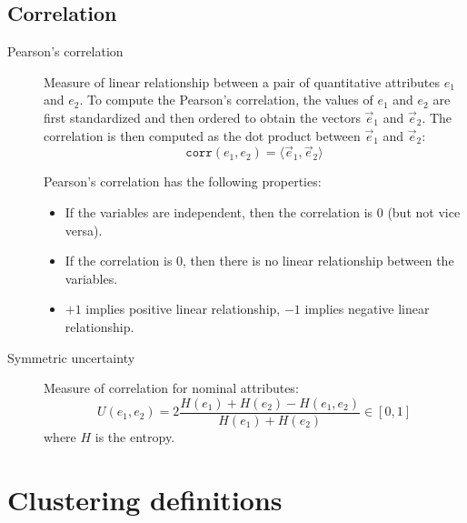\subsection{Correlation}

\begin{description}
    \item[Pearson's correlation] 
        Measure of linear relationship between a pair of quantitative attributes $e_1$ and $e_2$.
        To compute the Pearson's correlation, the values of $e_1$ and $e_2$ are first standardized and then ordered to obtain the vectors $\vec{e}_1$ and $\vec{e}_2$.
        The correlation is then computed as the dot product between $\vec{e}_1$ and $\vec{e}_2$:
        \[ \texttt{corr}(e_1, e_2) = \langle \vec{e}_1, \vec{e}_2 \rangle \]

        Pearson's correlation has the following properties:
        \begin{itemize}
            \item If the variables are independent, then the correlation is 0 (but not vice versa).
            \item If the correlation is 0, then there is no linear relationship between the variables.
            \item $+1$ implies positive linear relationship, $-1$ implies negative linear relationship.
        \end{itemize}

    \item[Symmetric uncertainty] 
        Measure of correlation for nominal attributes:
        \[ U(e_1, e_2) = 2 \frac{H(e_1) + H(e_2) - H(e_1, e_2)}{H(e_1) + H(e_2)} \in [0, 1] \]
        where $H$ is the entropy.
\end{description}




\section{Clustering definitions}

